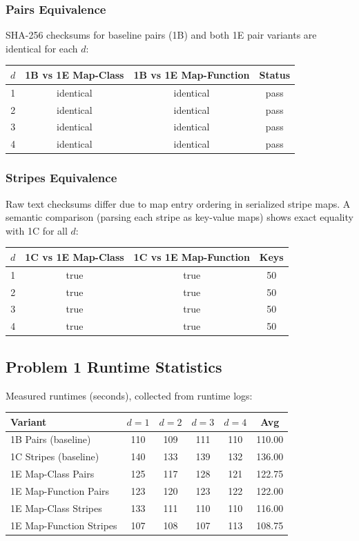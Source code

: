 \documentclass[11pt]{article}
\begin{document}
\subsubsection*{Pairs Equivalence}
SHA-256 checksums for baseline pairs (1B) and both 1E pair variants are identical for each $d$:
\begin{center}
\begin{tabular}{cccc}
\toprule
$d$ & 1B vs 1E Map-Class & 1B vs 1E Map-Function & Status \\
\midrule
1 & identical & identical & pass \\
2 & identical & identical & pass \\
3 & identical & identical & pass \\
4 & identical & identical & pass \\
\bottomrule
\end{tabular}
\end{center}

\subsubsection*{Stripes Equivalence}
Raw text checksums differ due to map entry ordering in serialized stripe maps.
A semantic comparison (parsing each stripe as key-value maps) shows exact equality with 1C for all $d$:
\begin{center}
\begin{tabular}{cccc}
\toprule
$d$ & 1C vs 1E Map-Class & 1C vs 1E Map-Function & Keys \\
\midrule
1 & true & true & 50 \\
2 & true & true & 50 \\
3 & true & true & 50 \\
4 & true & true & 50 \\
\bottomrule
\end{tabular}
\end{center}

\subsection{Problem 1 Runtime Statistics}
Measured runtimes (seconds), collected from runtime logs:
\begin{center}
\begin{tabular}{lccccc}
\toprule
Variant & $d=1$ & $d=2$ & $d=3$ & $d=4$ & Avg \\
\midrule
1B Pairs (baseline) & 110 & 109 & 111 & 110 & 110.00 \\
1C Stripes (baseline) & 140 & 133 & 139 & 132 & 136.00 \\
1E Map-Class Pairs & 125 & 117 & 128 & 121 & 122.75 \\
1E Map-Function Pairs & 123 & 120 & 123 & 122 & 122.00 \\
1E Map-Class Stripes & 133 & 111 & 110 & 110 & 116.00 \\
1E Map-Function Stripes & 107 & 108 & 107 & 113 & 108.75 \\
\bottomrule
\end{tabular}
\end{center}
\end{document}

